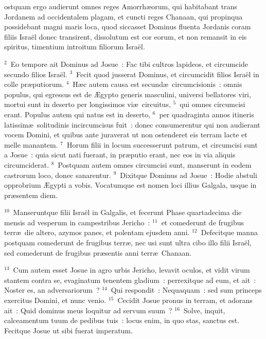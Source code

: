 \bchapter
{}ostquam ergo audierunt omnes reges Amorrh\ae orum, qui habitabant trans Jordanem ad occidentalem plagam, et cuncti reges Chanaan, qui propinqua possidebant magni maris loca, quod siccasset Dominus fluenta Jordanis coram filiis Isra\"el donec transirent, dissolutum est cor eorum, et non remansit in eis spiritus, timentium introitum filiorum Isra\"el.


${}^{2}$~Eo tempore ait Dominus ad Josue~: Fac tibi cultros lapideos, et circumcide secundo filios Isra\"el.
${}^{3}$~Fecit quod jusserat Dominus, et circumcidit filios Isra\"el in colle pr\ae putiorum.
${}^{4}$~H\ae c autem causa est secund\ae\ circumcisionis~: omnis populus, qui egressus est de \AE gypto generis masculini, universi bellatores viri, mortui sunt in deserto per longissimos vi\ae\ circuitus,
${}^{5}$~qui omnes circumcisi erant. Populus autem qui natus est in deserto,
${}^{6}$~per quadraginta annos itineris latissim\ae\ solitudinis incircumcisus fuit~: donec consumerentur qui non audierant vocem Domini, et quibus ante juraverat ut non ostenderet eis terram lacte et melle manantem.
${}^{7}$~Horum filii in locum successerunt patrum, et circumcisi sunt a Josue~: quia sicut nati fuerant, in pr\ae putio erant, nec eos in via aliquis circumciderat.
${}^{8}$~Postquam autem omnes circumcisi sunt, manserunt in eodem castrorum loco, donec sanarentur.
${}^{9}$~Dixitque Dominus ad Josue~: Hodie abstuli opprobrium \AE gypti a vobis. Vocatumque est nomen loci illius Galgala, usque in pr\ae sentem diem.


${}^{10}$~Manseruntque filii Isra\"el in Galgalis, et fecerunt Phase quartadecima die mensis ad vesperum in campestribus Jericho~:
${}^{11}$~et comederunt de frugibus terr\ae\ die altero, azymos panes, et polentam ejusdem anni.
${}^{12}$~Defecitque manna postquam comederunt de frugibus terr\ae , nec usi sunt ultra cibo illo filii Isra\"el, sed comederunt de frugibus pr\ae sentis anni terr\ae\ Chanaan.


${}^{13}$~Cum autem esset Josue in agro urbis Jericho, levavit oculos, et vidit virum stantem contra se, evaginatum tenentem gladium~: perrexitque ad eum, et ait~: Noster es, an adversariorum~?
${}^{14}$~Qui respondit~: Nequaquam~: sed sum princeps exercitus Domini, et nunc venio.
${}^{15}$~Cecidit Josue pronus in terram, et adorans ait~: Quid dominus meus loquitur ad servum suum~?
${}^{16}$~Solve, inquit, calceamentum tuum de pedibus tuis~: locus enim, in quo stas, sanctus est. Fecitque Josue ut sibi fuerat imperatum.

